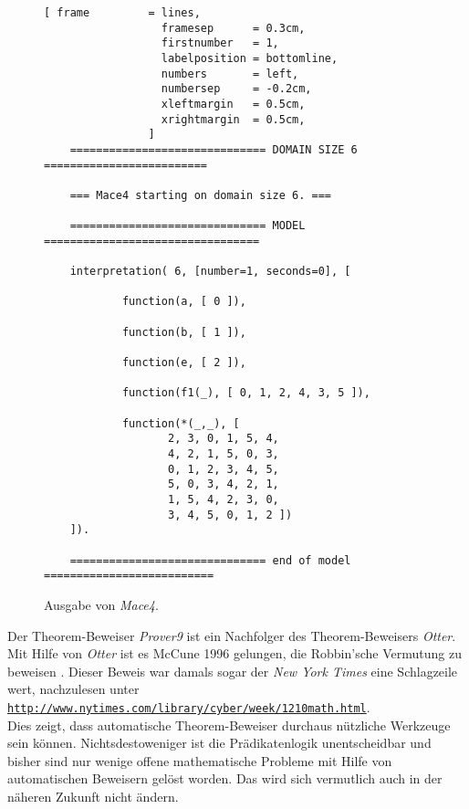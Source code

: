 \begin{figure}[!ht]
\centering
\begin{Verbatim}[ frame         = lines, 
                  framesep      = 0.3cm, 
                  firstnumber   = 1,
                  labelposition = bottomline,
                  numbers       = left,
                  numbersep     = -0.2cm,
                  xleftmargin   = 0.5cm,
                  xrightmargin  = 0.5cm,
                ]
    ============================== DOMAIN SIZE 6 =========================
    
    === Mace4 starting on domain size 6. ===
    
    ============================== MODEL =================================
    
    interpretation( 6, [number=1, seconds=0], [
    
            function(a, [ 0 ]),
    
            function(b, [ 1 ]),
    
            function(e, [ 2 ]),
    
            function(f1(_), [ 0, 1, 2, 4, 3, 5 ]),
    
            function(*(_,_), [
    			   2, 3, 0, 1, 5, 4,
    			   4, 2, 1, 5, 0, 3,
    			   0, 1, 2, 3, 4, 5,
    			   5, 0, 3, 4, 2, 1,
    			   1, 5, 4, 2, 3, 0,
    			   3, 4, 5, 0, 1, 2 ])
    ]).
    
    ============================== end of model ==========================
\end{Verbatim}
\vspace*{-0.3cm}
\caption{Ausgabe von \textsl{Mace4}.}
\label{fig:group.out}
\end{figure}

\remark
Der Theorem-Beweiser \textsl{Prover9} ist ein Nachfolger des Theorem-Beweisers \textsl{Otter}.  Mit Hilfe von
\textsl{Otter} ist es McCune 1996 gelungen, die Robbin'sche Vermutung zu beweisen \cite{mccune:1997}.
Dieser Beweis war damals sogar der \emph{New York Times} eine Schlagzeile wert,
nachzulesen unter
\\[0.2cm]
\hspace*{1.3cm}
\href{http://www.nytimes.com/library/cyber/week/1210math.html}{\texttt{http://www.nytimes.com/library/cyber/week/1210math.html}}.
\\[0.2cm]
Dies zeigt, dass automatische Theorem-Beweiser durchaus n\"{u}tzliche Werkzeuge sein
k\"{o}nnen.  Nichtsdestoweniger ist die Pr\"{a}dikatenlogik unentscheidbar und bisher sind 
nur wenige offene mathematische Probleme mit Hilfe von automatischen Beweisern gel\"{o}st
worden.  Das wird sich vermutlich auch in der n\"{a}heren Zukunft nicht 
\"{a}ndern.  \eox


